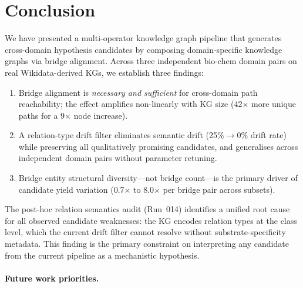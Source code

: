\section{Conclusion}
\label{sec:conclusion}

We have presented a multi-operator knowledge graph pipeline that generates
cross-domain hypothesis candidates by composing domain-specific knowledge graphs
via bridge alignment.
Across three independent bio-chem domain pairs on real Wikidata-derived KGs,
we establish three findings:

\begin{enumerate}[noitemsep]
\item Bridge alignment is \textit{necessary and sufficient} for cross-domain path
  reachability; the effect amplifies non-linearly with KG size (42$\times$ more
  unique paths for a 9$\times$ node increase).

\item A relation-type drift filter eliminates semantic drift (25\%$\to$0\% drift rate)
  while preserving all qualitatively promising candidates, and generalises across
  independent domain pairs without parameter retuning.

\item Bridge entity structural diversity---not bridge count---is the primary driver
  of candidate yield variation (0.7$\times$ to 8.0$\times$ per bridge pair across subsets).
\end{enumerate}

The post-hoc relation semantics audit (Run~014) identifies a unified root cause
for all observed candidate weaknesses: the KG encodes relation types at the
class level, which the current drift filter cannot resolve without substrate-specificity
metadata.
This finding is the primary constraint on interpreting any candidate from the current
pipeline as a mechanistic hypothesis.

\paragraph{Future work priorities.}

